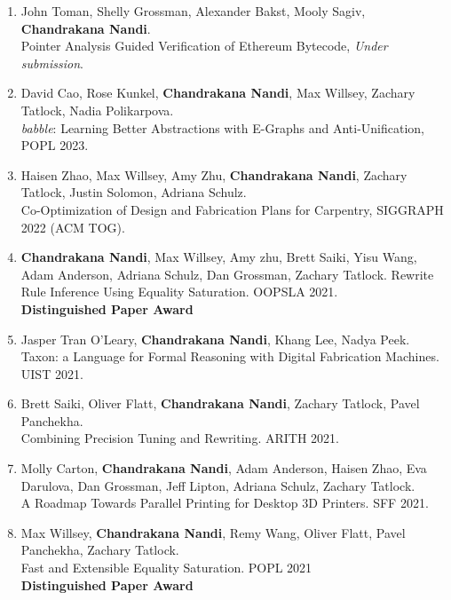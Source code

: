 \documentclass[margin, 10pt]{res} %
\begin{document}
\begin{resume}
\begin{enumerate}
  \item John Toman, Shelly Grossman, Alexander Bakst, Mooly Sagiv, \textbf{Chandrakana Nandi}. \\
    Pointer Analysis Guided Verification of Ethereum Bytecode, \textit{Under submission}.

  \item David Cao, Rose Kunkel, \textbf{Chandrakana Nandi}, Max Willsey, Zachary Tatlock, Nadia Polikarpova. \\
    \textit{babble}: Learning Better Abstractions with E-Graphs and Anti-Unification, POPL 2023.

  \item Haisen  Zhao, Max Willsey, Amy Zhu, \textbf{Chandrakana Nandi}, Zachary Tatlock, Justin Solomon, Adriana Schulz. \\
    Co-Optimization of Design and Fabrication Plans for Carpentry, SIGGRAPH 2022 (ACM TOG).

  \item \textbf{Chandrakana Nandi}, Max Willsey, Amy zhu, Brett Saiki, Yisu Wang, Adam Anderson, Adriana Schulz, Dan Grossman, Zachary Tatlock.
    Rewrite Rule Inference Using Equality Saturation. OOPSLA 2021. \\
    \textbf{Distinguished Paper Award}

  \item Jasper Tran O'Leary, \textbf{Chandrakana Nandi}, Khang Lee, Nadya Peek. \\
  Taxon: a Language for Formal Reasoning with Digital Fabrication Machines. UIST 2021.

\item Brett Saiki, Oliver Flatt, \textbf{Chandrakana Nandi}, Zachary Tatlock, Pavel Panchekha. \\
  Combining Precision Tuning and Rewriting. ARITH 2021.

\item Molly Carton, \textbf{Chandrakana Nandi}, Adam Anderson, Haisen Zhao, Eva Darulova, Dan Grossman, Jeff Lipton, Adriana Schulz, Zachary Tatlock. \\
  A Roadmap Towards Parallel Printing for Desktop 3D Printers. SFF 2021.

\item Max Willsey, \textbf{Chandrakana Nandi}, Remy Wang, Oliver Flatt, Pavel Panchekha, Zachary Tatlock. \\
    Fast and Extensible Equality Saturation. POPL 2021 \\
    \textbf{Distinguished Paper Award}


\end{enumerate}
\end{resume}
\end{document}
